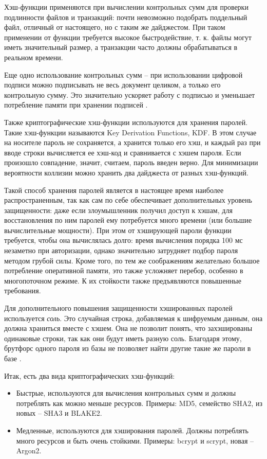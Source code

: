 Хэш-функции применяются при вычислении контрольных сумм для проверки подлинности файлов и транзакций: почти невозможно подобрать поддельный файл, отличный от настоящего, но с таким же дайджестом. При таком применении от функции требуется высокое быстродействие, т. к. файлы могут иметь значительный размер, а транзакции часто должны обрабатываться в реальном времени.

Еще одно использование контрольных сумм – при использовании цифровой подписи можно подписывать не весь документ целиком, а только его контрольную сумму. Это значительно ускоряет работу с подписью и уменьшает потребление памяти при хранении подписей \cite{src15}.

Также криптографические хэш-функции используются для хранения паролей. Такие хэш-функции называются Key Derivation Functions, KDF. В этом случае на носителе пароль не сохраняется, а хранится только его хэш, и каждый раз при вводе строки вычисляется ее хэш-код и сравнивается с хэшем пароля. Если произошло совпадение, значит, считаем, пароль введен верно. Для минимизации вероятности коллизии можно хранить два дайджеста от разных хэш-функций.

Такой способ хранения паролей является в настоящее время наиболее распространенным, так как сам по себе обеспечивает дополнительных уровень защищенности: даже если злоумышленник получил доступ к хэшам, для восстановления по ним паролей ему потребуется много времени (или большие вычислительные мощности). При этом от хэширующей пароли функции требуется, чтобы она вычислялась долго: время вычисления порядка 100 мс незаметно при авторизации, однако значительно затрудняет подбор пароля методом грубой силы. Кроме того, по тем же соображениям желательно большое потребление оперативной памяти, это также усложняет перебор, особенно в многопоточном режиме. К их стойкости также предъявляются повышенные требования.

Для дополнительного повышения защищенности хэшированных паролей используется \textit{соль}. Это случайная строка, добавляемая к шифруемым данным, она должна храниться вместе с хэшем. Она не позволит понять, что захэшированы одинаковые строки, так как они будут иметь разную соль. Благодаря этому, брутфорс одного пароля из базы не позволяет найти другие такие же пароли в базе \cite{src15}.

Итак, есть два вида криптографических хэш-функций:
\begin{itemize}
	\item Быстрые, используются для вычисления контрольных сумм и должны потреблять как можно меньше ресурсов. Примеры: MD5, семейство SHA2, из новых – SHA3 и BLAKE2.
	\item Медленные, используются для хэширования паролей. Должны потреблять много ресурсов и быть очень стойкими. Примеры: bcrypt и scrypt, новая – Argon2.
\end{itemize}








